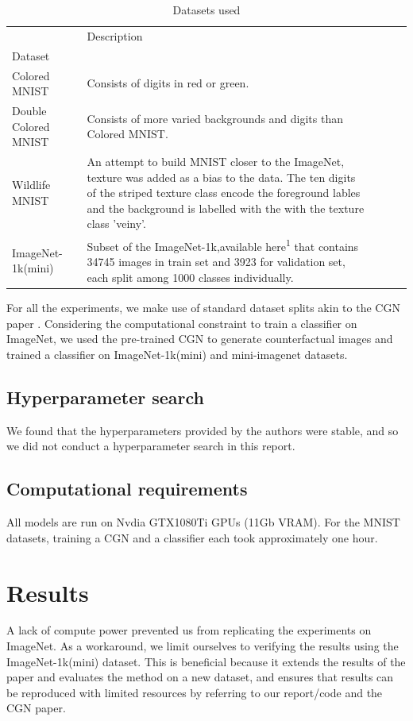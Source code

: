 \fi


\begin{table}[h]
\centering

\begin{tabularx}{\textwidth}{lXXXX}
\toprule
{} & Description\\
Dataset&\\
\midrule
Colored MNIST & Consists of digits in red or green.  \\ 
Double Colored MNIST & Consists of more varied backgrounds and digits than Colored MNIST.  \\
Wildlife MNIST & An attempt to build MNIST \cite{lecun1998gradient} closer to the ImageNet\cite{deng2009imagenet}, texture was added as a bias to the data. The ten digits of the striped texture class encode the foreground lables and the background is labelled with the with the texture class 'veiny'.  \\
ImageNet-1k(mini) & Subset of the ImageNet-1k\cite{ImageNet-1k},available here\textsuperscript{1} that contains 34745 images in train set and 3923 for validation set, each split among 1000 classes individually.
\label{table:imagenet_ood}
\end{tabularx}
\caption{Datasets used}
\end{table}
For all the experiments, we make use of standard dataset splits akin to the CGN paper \cite{sauer2021counterfactual}. Considering the computational constraint to train a classifier on ImageNet\cite{imagenet}, we used the pre-trained CGN to generate counterfactual images and trained a classifier on ImageNet-1k(mini) and mini-imagenet datasets.


\subsection{Hyperparameter search}
We found that the hyperparameters provided by the authors were stable, and so we did not conduct a hyperparameter search in this report.

\subsection{Computational requirements}
All models are run on Nvdia GTX1080Ti GPUs (11Gb VRAM). For the MNIST datasets, training a CGN and a classifier each took approximately one hour.

\section{Results}
\label{sec:results}
A lack of compute power prevented us from replicating the experiments on ImageNet. As a workaround,  we limit ourselves to verifying the results using the ImageNet-1k(mini) dataset. This is beneficial because it extends the results of the paper and evaluates the method on a new dataset, and ensures that results can be reproduced with limited resources by referring to our report/code and the CGN paper.

